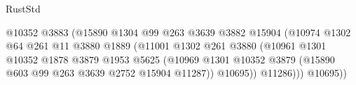 \begin{lexlean}{RustStd}
\begin{coremodule}
                                                  @10352
                                                  @3883
                                                  (@15890
                                                    @1304
                                                    @99
                                                    @263
                                                    @3639
                                                    @3882
                                                    @15904
                                                    (@10974
                                                      @1302
                                                      @64
                                                      @261
                                                      @11
                                                      @3880
                                                      @1889
                                                      (@11001
                                                        @1302
                                                        @261
                                                        @3880
                                                        (@10961
                                                          @1301
                                                          @10352
                                                          @1878
                                                          @3879
                                                          @1953
                                                          @5625
                                                          (@10969
                                                            @1301
                                                            @10352
                                                            @3879
                                                            (@15890
                                                              @603
                                                              @99
                                                              @263
                                                              @3639
                                                              @2752
                                                              @15904
                                                              @11287))
                                                          @10695))
                                                      @11286)))
                                                @10695))

\end{coremodule}
\end{lexlean}
